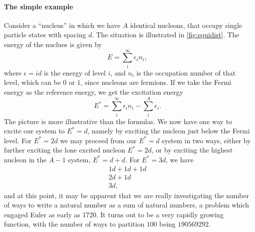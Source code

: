 \paragraph{The simple example}
Consider a ``nucleus'' in which we have $A$ identical nucleons, that occupy single particle states with spacing $d$. The situation is illustrated in \autoref{fig:equidist}. The energy of the nuclues is given by 
\begin{equation}
E=\sum_i^\infty \epsilon_i n_i,
\end{equation}
where $\epsilon = id$ is the energy of level $i$, and $n_i$ is the occupation number of that level, which can be $0$ or $1$, since nucleons are fermions.
If we take the Fermi energy as the reference energy, we get the excitation energy
\begin{equation}
E^*=\sum_i^\infty \epsilon_i n_i - \sum_i^A \epsilon_i.
\end{equation}
The picture is more illustrative than the formulas. We now have one way to excite our system to $E^*=d$, namely by exciting the nucleon just below the Fermi level. For $E^*=2d$ we may proceed from our $E^*=d$ system in two ways, either by further exciting the lone excited nucleon $E^* = 2d$, or by exciting the highest nucleon in the $A-1$ system, $E^*=d+d$. For $E^*=3d$, we have
\begin{equation}
\begin{aligned}
1d+1d+1d \\
2d+1d \\
3d,
\end{aligned}
\end{equation}
and at this point, it may be apparent that we are really investigating the number of ways to write a natural number as a sum of natural numbers, a problem which engaged Euler as early as 1720\cite{mathworld}. It turns out to be a very rapidly growing function, with the number of ways to partition $100$ being $190 569 292$\cite{mathworld}.

